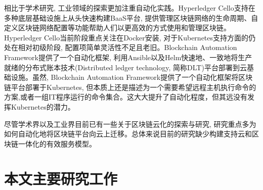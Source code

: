 相比于学术研究, 工业领域的探索更加注重自动化实践。Hyperledger Cello\footnotemark[1]支持在多种底层基础设施上从头快速构建BaaS平台, 提供管理区块链网络的生命周期、自定义区块链网络配置等功能帮助人们以更高效的方式使用和管理区块链。Hyperledger Cello当前阶段重点关注在Docker安装, 对于Kubernetes支持方面的仍处在相对初级阶段, 配置项简单灵活性不足且老旧。Blockchain Automation Framework\footnotemark[2]提供了一个自动化框架, 利用Ansible\footnotemark[2]以及Helm\footnotemark[3]快速地、一致地将生产就绪的分布式账本技术(Distributed ledger technology, 简称DLT)平台部署到云基础设施。虽然, Blockchain Automation Framework提供了一个自动化框架将区块链平台部署于Kubernetes, 但本质上还是描述为一个需要希望远程主机执行命令的方案,或者一组IT程序运行的命令集合。这大大提升了自动化程度，但其远没有发挥Kubernetes的潜力。

尽管学术界以及工业界目前已有一些关于区块链云化的探索与研究, 研究重点多为如何自动化地将区块链平台向云上迁移。总体来说目前的研究缺少构建支持云和区块链一体化的有效服务模型\cite{9582270}。

\section{本文主要研究工作}





